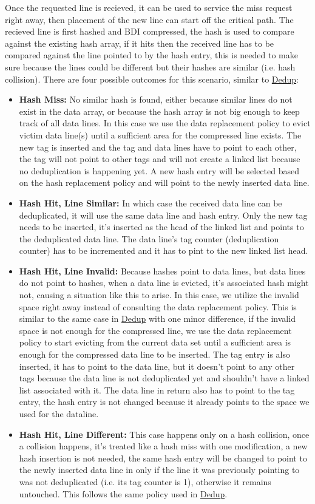 Once the requested line is recieved, it can be used to service the miss request right away, then placement of the new line can start off the critical path. The recieved line is first hashed and BDI compressed, the hash is used to compare against the existing hash array, if it hits then the received line has to be compared against the line pointed to by the hash entry, this is needed to make sure because the lines could be different but their hashes are similar (i.e. hash collision). There are four possible outcomes for this scenario, similar to \hyperref[sssec:DedupOperations]{Dedup}:
\begin{itemize}
    \item \textbf{Hash Miss:} No similar hash is found, either because similar lines do not exist in the data array, or because the hash array is not big enough to keep track of all data lines. In this case we use the data replacement policy to evict victim data line(s) until a sufficient area for the compressed line exists. The new tag is inserted and the tag and data lines have to point to each other, the tag will not point to other tags and will not create a linked list because no deduplication is happening yet. A new hash entry will be selected based on the hash replacement policy and will point to the newly inserted data line.
    \item \textbf{Hash Hit, Line Similar:} In which case the received data line can be deduplicated, it will use the same data line and hash entry. Only the new tag needs to be inserted, it's inserted as the head of the linked list and points to the deduplicated data line. The data line's tag counter (deduplication counter) has to be incremented and it has to pint to the new linked list head.
    \item \textbf{Hash Hit, Line Invalid:} Because hashes point to data lines, but data lines do not point to hashes, when a data line is evicted, it's associated hash might not, causing a situation like this to arise. In this case, we utilize the invalid space right away instead of consulting the data replacement policy. This is similar to the same case in \hyperref[sssec:DedupOperations]{Dedup} with one minor difference, if the invalid space is not enough for the compressed line, we use the data replacement policy to start evicting from the current data set until a sufficient area is enough for the compressed data line to be inserted. The tag entry is also inserted, it has to point to the data line, but it doesn't point to any other tags because the data line is not deduplicated yet and shouldn't have a linked list associated with it. The data line in return also has to point to the tag entry, the hash entry is not changed because it already points to the space we used for the dataline.
    \item \textbf{Hash Hit, Line Different:} This case happens only on a hash collision, once a collision happens, it's treated like a hash miss with one modification, a new hash insertion is not needed, the same hash entry will be changed to point to the newly inserted data line in only if the line it was previously pointing to was not deduplicated (i.e. its tag counter is 1), otherwise it remains untouched. This follows the same policy used in \hyperref[sssec:DedupOperations]{Dedup}.
\end{itemize}
